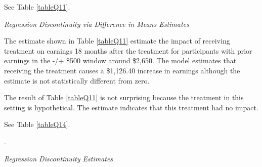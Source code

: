 \documentclass[12pt]{article}
\begin{document}
\begin{list}{}{}
    \item See Table \ref{tableQ11}.
    \begin{table}[h!]
        \centering
        \caption{\textit{Regression Discontinuity via Difference in Means 
                        Estimates} }
        \label{tableQ11}
    \end{table}
\end{list}

\begin{list}{}{}
    \item The estimate shown in Table \ref{tableQ11} estimate the impact of 
    receiving treatment on earnings 18 months after the treatment for 
    participants with prior earnings in the -/+ \$500 window around \$2,650. 
    The model estimates that receiving the treatment causes a \$1,126.40 
    increase in earnings although the estimate is not statistically different 
    from zero.
\end{list}

\begin{list}{}{}
    \item The result of Table \ref{tableQ11} is not surprising because the 
    treatment in this setting is hypothetical.  The estimate indicates that this 
    treatment had no impact. 
\end{list}

\begin{list}{}{}
    \item See Table \ref{tableQ14}.
    \begin{table}[h!]
        \centering. 
        \caption{\textit{Regression Discontinuity Estimates} }
        \label{tableQ14}
    \end{table}
\end{list}
\end{document}
